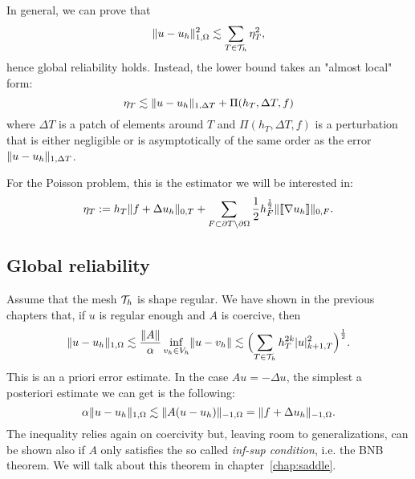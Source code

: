In general, we can prove that
\[
\lVert u - u_h\rVert_{1,\Omega}^2 \lesssim \sum_{T \in \mathcal{T}_h} \eta_T^2,
\]
hence global reliability holds. Instead, the lower bound takes an "almost local" form:
\[
\eta_T \lesssim \lVert u-u_h\rVert_{1,\Delta T} + \Pi(h_T,\Delta T,f)
\]
where $\Delta T$ is a patch of elements around $T$ and $\Pi(h_T,\Delta T,f)$ is a perturbation that is either negligible or is asymptotically of the same order as the
error $\lVert u-u_h\rVert_{1,\Delta T}$.

For the Poisson problem, this is the estimator we will be interested in:
\begin{equation}\label{eqn:estimator}
    \eta_T := h_T \lVert f + \Delta u_h\rVert_{0,T}
    + \sum_{F \subset \partial T \setminus \partial\Omega} \frac{1}{2} h_F^{\frac{1}{2}} \lVert\llbracket\nabla u_h\rrbracket\rVert_{0,F}.
\end{equation}


\subsection{Global reliability}

Assume that the mesh $\mathcal{T}_h$ is shape regular. We have shown in the previous chapters that, if $u$ is regular enough and $A$ is coercive, then
\[
\lVert u-u_h\rVert_{1,\Omega} \lesssim \frac{\lVert A\rVert}{\alpha} \inf_{v_h \in V_h} \lVert u-v_h\rVert
\lesssim \Bigl( \sum_{T \in \mathcal{T}_h} h_T^{2k} \lvert u\rvert_{k+1,T}^2 \Bigr)^{\frac{1}{2}}.
\]
This is an a priori error estimate. In the case $Au = -\Delta u$, the simplest a posteriori estimate we can get is the following:
\begin{equation}\label{eqn:apost_rough}
    \alpha \lVert u-u_h\rVert_{1,\Omega} \lesssim \lVert A(u-u_h)\rVert_{-1,\Omega} = \lVert f+\Delta u_h\rVert_{-1,\Omega}.
\end{equation}
The inequality relies again on coercivity but, leaving room to generalizations, can be shown also if $A$ only satisfies the so called \emph{inf-sup condition}, i.e. the BNB theorem. We will talk about this theorem in chapter~\ref{chap:saddle}.

